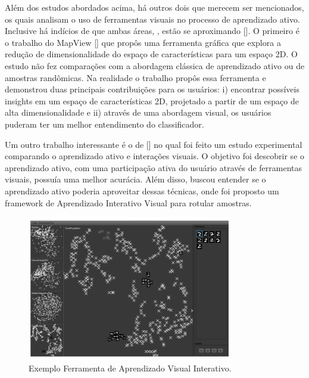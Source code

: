 Além dos estudos abordados acima, há outros dois que merecem ser mencionados, os quais analisam o uso de ferramentas visuais no processo de aprendizado ativo. Inclusive há indícios de que ambas áreas, , estão se aproximando [\cite{sacha2016human}]. O primeiro é o trabalho do MapView [\cite{weigl2016mapview}] que propôs uma ferramenta gráfica que explora a redução de dimensionalidade do espaço de características para um espaço 2D. O estudo não fez comparações com a abordagem clássica de aprendizado ativo ou de amostras randômicas. Na realidade o trabalho propôs essa ferramenta e demonstrou duas principais contribuições para os usuários: i) encontrar possíveis insights em um espaço de características 2D, projetado a partir de um espaço de alta dimensionalidade e ii) através de uma abordagem visual, os usuários puderam ter um melhor entendimento do classificador. 

Um outro trabalho interessante é o de [\cite{bernard2018comparing}] no qual foi feito um estudo experimental comparando o aprendizado ativo e interações visuais. O objetivo foi descobrir se o aprendizado ativo, com uma participação ativa do usuário através de ferramentas visuais, possuía uma melhor acurácia. Além disso, buscou entender se o aprendizado ativo poderia aproveitar dessas técnicas, onde foi proposto um framework de Aprendizado Interativo Visual para rotular amostras. 

\begin{figure}
  \centering
  \includegraphics[width=0.8\textwidth]{figures/visual_comparing.png}
  \caption{Exemplo Ferramenta de Aprendizado Visual Interativo.}
  \label{fig:visual_comparing}
\end{figure}


